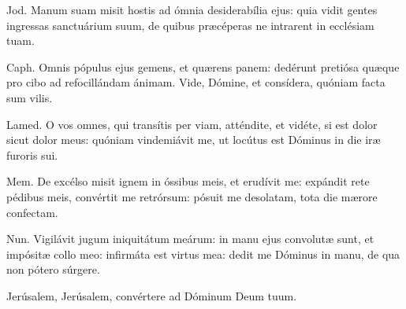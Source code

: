 
Jod. Manum suam misit hostis ad ómnia desiderabília ejus: quia vidit gentes ingressas sanctuárium suum, de quibus præcéperas ne intrarent in ecclésiam tuam.

Caph. Omnis pópulus ejus gemens, et quærens panem: dedérunt pretiósa quæque pro cibo ad refocillándam ánimam. Vide, Dómine, et consídera, quóniam facta sum vilis.

Lamed. O vos omnes, qui transítis per viam, atténdite, et vidéte, si est dolor sicut dolor meus: quóniam vindemiávit me, ut locútus est Dóminus in die iræ furoris sui.

Mem. De excélso misit ignem in óssibus meis, et erudívit me: expándit rete pédibus meis, convértit me retrórsum: pósuit me desolatam, tota die mærore confectam.

Nun. Vigilávit jugum iniquitátum meárum: in manu ejus convolutæ sunt, et impósitæ collo meo: infirmáta est virtus mea: dedit me Dóminus in manu, de qua non pótero súrgere.

Jerúsalem, Jerúsalem, convértere ad Dóminum Deum tuum.
\par